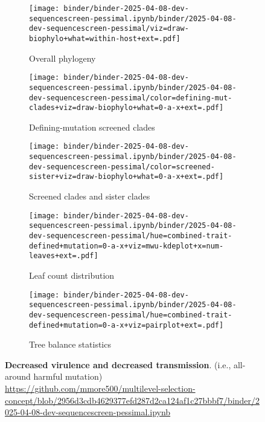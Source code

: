 \begin{figure*}[htbp]
  \centering
  \begin{subfigure}{0.32\textwidth}
    \centering
    \texttt{[image: binder/binder-2025-04-08-dev-sequencescreen-pessimal.ipynb/binder/2025-04-08-dev-sequencescreen-pessimal/viz=draw-biophylo+what=within-host+ext=.pdf]}
    \caption{Overall phylogeny}
    \label{fig:dev-sequencescreen-pessimal:overall_phylogeny}
  \end{subfigure}
  \hfill
  \begin{subfigure}{0.32\textwidth}
    \centering
    \texttt{[image: binder/binder-2025-04-08-dev-sequencescreen-pessimal.ipynb/binder/2025-04-08-dev-sequencescreen-pessimal/color=defining-mut-clades+viz=draw-biophylo+what=0-a-x+ext=.pdf]}
    \caption{Defining-mutation screened clades}
    \label{fig:dev-sequencescreen-pessimal:defining_mut_clades}
  \end{subfigure}
  \hfill
  \begin{subfigure}{0.32\textwidth}
    \centering
    \texttt{[image: binder/binder-2025-04-08-dev-sequencescreen-pessimal.ipynb/binder/2025-04-08-dev-sequencescreen-pessimal/color=screened-sister+viz=draw-biophylo+what=0-a-x+ext=.pdf]}
    \caption{Screened clades and sister clades}
    \label{fig:dev-sequencescreen-pessimal:screened_sister}
  \end{subfigure}

  \vspace{0.5cm} %

  \begin{subfigure}{0.54\textwidth}
    \centering
    \texttt{[image: binder/binder-2025-04-08-dev-sequencescreen-pessimal.ipynb/binder/2025-04-08-dev-sequencescreen-pessimal/hue=combined-trait-defined+mutation=0-a-x+viz=mwu-kdeplot+x=num-leaves+ext=.pdf]}
    \caption{Leaf count distribution}
    \label{fig:dev-sequencescreen-pessimal:leaf_count}
  \end{subfigure}
  \hfill
  \begin{subfigure}{0.44\textwidth}
    \centering
    \texttt{[image: binder/binder-2025-04-08-dev-sequencescreen-pessimal.ipynb/binder/2025-04-08-dev-sequencescreen-pessimal/hue=combined-trait-defined+mutation=0-a-x+viz=pairplot+ext=.pdf]}
    \caption{Tree balance statistics}
    \label{fig:dev-sequencescreen-pessimal:tree_balance}
  \end{subfigure}

  \caption{\textbf{Decreased virulence and decreased transmission}. (i.e., all-around harmful mutation) \url{https://github.com/mmore500/multilevel-selection-concept/blob/2956d3cdb4629377efd287d2ca124af1c27bbbf7/binder/2025-04-08-dev-sequencescreen-pessimal.ipynb}}
  \label{fig:dev-sequencescreen-pessimal}
\end{figure*}
